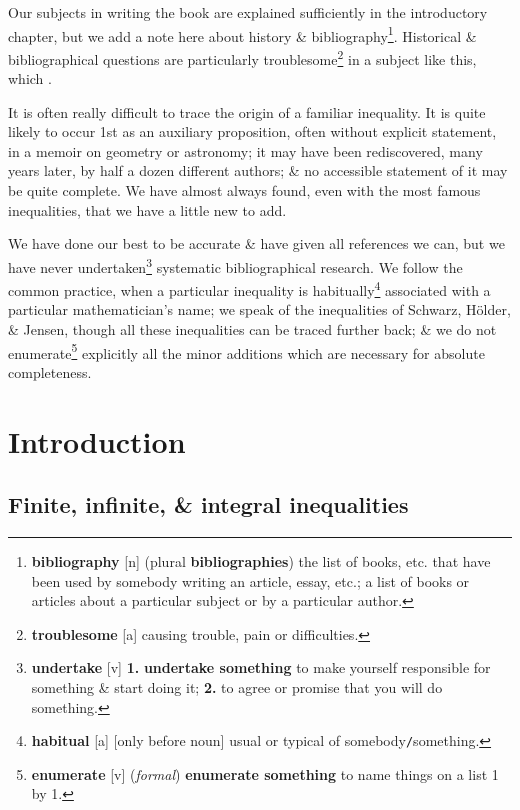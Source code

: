 \documentclass[oneside]{book}
\numberwithin{equation}{section}
\begin{document}
Our subjects in writing the book are explained sufficiently in the introductory chapter, but we add a note here about history \& bibliography\footnote{\textbf{bibliography} [n] (plural \textbf{bibliographies}) the list of books, etc. that have been used by somebody writing an article, essay, etc.; a list of books or articles about a particular subject or by a particular author.}. Historical \& bibliographical questions are particularly troublesome\footnote{\textbf{troublesome} [a] causing trouble, pain or difficulties.} in a subject like this, which .

It is often really difficult to trace the origin of a familiar inequality. It is quite likely to occur 1st as an auxiliary proposition, often without explicit statement, in a memoir on geometry or astronomy; it may have been rediscovered, many years later, by half a dozen different authors; \& no accessible statement of it may be quite complete. We have almost always found, even with the most famous inequalities, that we have a little new to add.

We have done our best to be accurate \& have given all references we can, but we have never undertaken\footnote{\textbf{undertake} [v] \textbf{1.} \textbf{undertake something} to make yourself responsible for something \& start doing it; \textbf{2.} to agree or promise that you will do something.} systematic bibliographical research. We follow the common practice, when a particular inequality is habitually\footnote{\textbf{habitual} [a] [only before noun] usual or typical of somebody\texttt{/}something.} associated with a particular mathematician's name; we speak of the inequalities of Schwarz, H\"older, \& Jensen, though all these inequalities can be traced further back; \& we do not enumerate\footnote{\textbf{enumerate} [v] (\textit{formal}) \textbf{enumerate something} to name things on a list 1 by 1.} explicitly all the minor additions which are necessary for absolute completeness.


\section{Introduction}

\subsection{Finite, infinite, \& integral inequalities}
\end{document}
